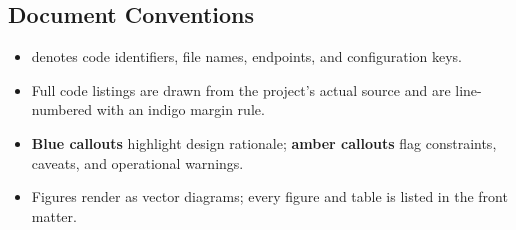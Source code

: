 \vspace{10pt}
\begin{center}
\end{center}

\vfill
\subsection*{\color{uaIndigoD}Document Conventions}
\begin{itemize}
  \item {} denotes code identifiers, file names, endpoints,
        and configuration keys.
  \item Full code listings are drawn from the project's actual source and are
        line-numbered with an indigo margin rule.
  \item \textbf{Blue callouts} highlight design rationale; \textbf{amber
        callouts} flag constraints, caveats, and operational warnings.
  \item Figures render as vector diagrams; every figure and table is listed in
        the front matter.
\end{itemize}
